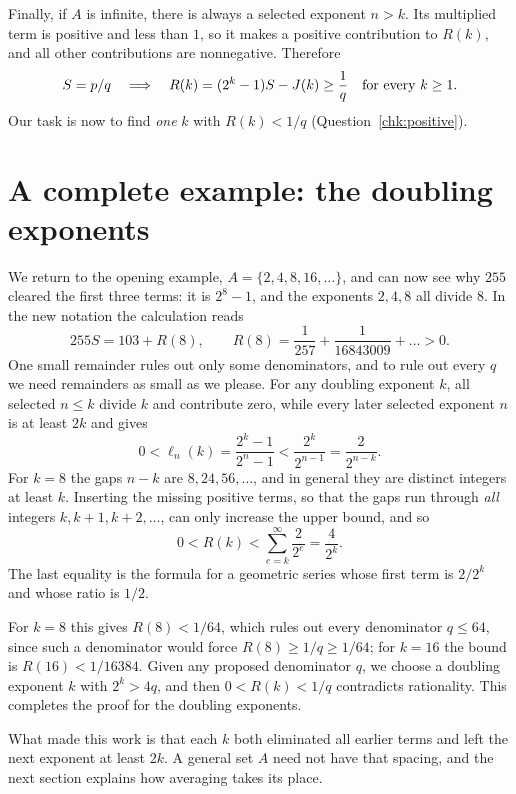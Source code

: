 \documentclass[10pt]{article}
\theoremstyle{plain}
\theoremstyle{definition}
\theoremstyle{remark}
\newcommand{\lft}{\ell}
\begin{document}
Finally, if $A$ is infinite, there is always a selected exponent
$n>k$. Its multiplied term is positive and less than $1$, so it makes a
positive contribution to $R(k)$, and all other contributions are
nonnegative. Therefore
\[
 S=p/q\quad\Longrightarrow\quad
 R(k)=(2^k-1)S-J(k)\ge\frac1q\quad\hbox{for every }k\ge1.
\]
Our task is now to find \emph{one} $k$ with $R(k)<1/q$
(Question~\ref{chk:positive}).

\section{A complete example: the doubling exponents}\label{sec:doubling}

We return to the opening example, $A=\{2,4,8,16,\dots\}$, and can now
see why $255$ cleared the first three terms: it is $2^8-1$, and the
exponents $2,4,8$ all divide $8$. In the new notation the calculation
reads
\[
 255S=103+R(8),\qquad R(8)=\frac1{257}+\frac1{16843009}+\dots>0.
\]
One small remainder rules out only some denominators, and to rule out
every $q$ we need remainders as small as we please. For any doubling
exponent $k$, all selected $n\le k$ divide $k$ and contribute zero, while
every later selected exponent $n$ is at least $2k$ and gives
\[
 0<\lft_n(k)=\frac{2^k-1}{2^n-1}
 <\frac{2^k}{2^{n-1}}=\frac2{2^{n-k}}.
\]
For $k=8$ the gaps $n-k$ are $8,24,56,\dots$, and in general they are
distinct integers at least $k$. Inserting the missing positive terms, so
that the gaps run through \emph{all} integers $k,k+1,k+2,\dots$, can only
increase the upper bound, and so
\[
 0<R(k)<\sum_{e=k}^{\infty}\frac2{2^e}=\frac4{2^k}.
\]
The last equality is the formula for a geometric series whose first
term is $2/2^k$ and whose ratio is $1/2$.

\begin{samepage}
For $k=8$ this gives $R(8)<1/64$, which rules out every denominator
$q\le64$, since such a denominator would force $R(8)\ge1/q\ge1/64$; for
$k=16$ the bound is $R(16)<1/16384$. Given any proposed denominator $q$,
we choose a doubling exponent $k$ with $2^k>4q$, and then $0<R(k)<1/q$
contradicts rationality. This completes the proof for the doubling
exponents.\par
\end{samepage}

What made this work is that each $k$ both eliminated all earlier terms
and left the next exponent at least $2k$. A general set $A$ need not
have that spacing, and the next section explains how averaging takes
its place.
\end{document}
